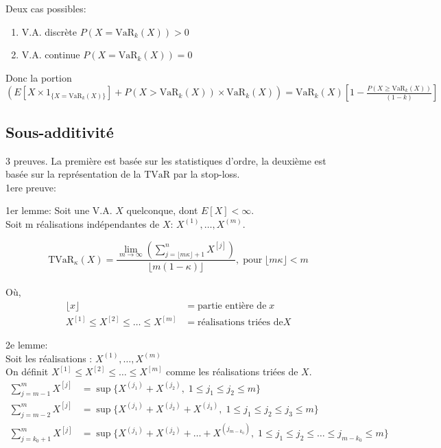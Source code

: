 Deux cas possibles:

\begin{enumerate}
\def\labelenumi{\arabic{enumi}.}
\item
  V.A. discrète \(P(X=\text{VaR}_k(X))>0\)
\item
  V.A. continue \(P(X=\text{VaR}_k(X))=0\)
\end{enumerate}

Donc la portion
\((E[X\times\mathrm{1}_{\{X=\text{VaR}_k(X)\}}]+P(X>\text{VaR}_k(X))\times\text{VaR}_k(X))= \text{VaR}_k(X)[1-\frac{P(X\ge\text{VaR}_k(X))}{(1-k)}]\)




\subsection*{Sous-additivité}\label{sous-additivite-1}

\label{preuves:tvar:prop:sousadd} 3 preuves. La première est basée sur
les statistiques d'ordre, la deuxième est basée sur la représentation de
la \(\text{TVaR}\) par la stop-loss.\\
1ere preuve: 

1er lemme: Soit une V.A. \(X\) quelconque,
dont \(E[X]<\infty\).\\
Soit m réalisations indépendantes de \(X\): \(X^{(1)},\dots,X^{(m)}\).

\[
\text{TVaR}_{\kappa}(X) =\frac{\lim_{m\to\infty} \left(\sum^n_{j=\lfloor m\kappa\rfloor +1} X^{[j]} \right)}{\lfloor m(1-\kappa)\rfloor},\;\text{pour}\;\lfloor m\kappa \rfloor <m
\]\\
Où,\\
\begin{align*}
\lfloor x \rfloor& =\text{partie entière de}\;x\\
X^{[1]}\le X^{[2]}\le \dots \le X^{[m]}& =\text{réalisations triées de} X
\end{align*}

2e lemme:\\
Soit les réalisations : \(X^{(1)},\dots,X^{(m)}\)\\
On définit \(X^{[1]}\le X^{[2]} \le \dots \le X^{[m]}\) comme les
réalisations triées de \(X\).\\

\begin{align*}
\sum^m_{j=m-1}X^{[j]}& = \sup\{X^{(j_1)}+X^{(j_2)},\; 1\le j_1 \le j_2 \le m\}\\
\sum^m_{j=m-2}X^{[j]}& = \sup\{X^{(j_1)}+X^{(j_2)}+X^{(j_3)},\; 1\le j_1 \le j_2 \le j_3 \le m\}\\
\sum^m_{j=k_0+1}X^{[j]}& = \sup\{X^{(j_1)}+X^{(j_2)}+\dots+X^{(j_{m-k_0})},\; 1\le j_1 \le j_2 \le \dots \le j_{m-k_0} \le m\}
\end{align*}


